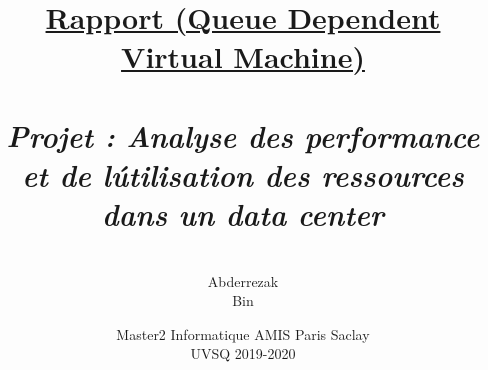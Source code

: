 \documentclass[12pt]{article}
\begin{document}
\title{\textbf{\underline{ Rapport (Queue Dependent Virtual Machine)} \\  \emph{\\Projet : Analyse des performance et de l\'utilisation des ressources dans un data center}}}
\author{  \\ Abderrezak \\Bin {} }
\date{Master2 Informatique AMIS Paris Saclay \\UVSQ 2019-2020}


\vspace{10cm}
\maketitle
\newpage
\tableofcontents
{}









\end{document}

